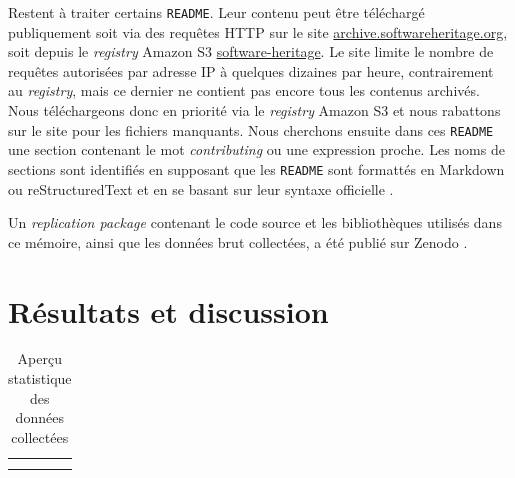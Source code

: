 \documentclass[dvipsnames,runningheads]{llncs}
\newcommand{\en}[1]{\foreignlanguage{english}{\emph{#1}}}
\begin{document}
    \label{sec:collectreadme}
    Restent à traiter certains \texttt{README}. Leur contenu peut être téléchargé publiquement soit via des
    requêtes HTTP sur le site \href{https://archive.softwareheritage.org/}{archive.softwareheritage.org}, soit
    depuis le \en{registry} Amazon S3
    \href{https://registry.opendata.aws/software-heritage}{software-heritage}. Le site limite le nombre de
    requêtes autorisées par adresse IP à quelques dizaines par heure, contrairement au \en{registry}, mais ce
    dernier ne contient pas encore tous les contenus archivés. Nous téléchargeons donc en priorité via le
    \en{registry} Amazon S3 et nous rabattons sur le site pour les fichiers manquants. Nous cherchons ensuite
    dans ces \texttt{README} une section contenant le mot \en{contributing} ou une expression proche. Les noms
    de sections sont identifiés en supposant que les \texttt{README} sont formattés en Markdown ou
    reStructuredText et en se basant sur leur syntaxe officielle \parencite{markdown-headings,rst-sections}.

    Un \en{replication package} contenant le code source et les bibliothèques utilisés dans ce mémoire, ainsi
    que les données brut collectées, a été publié sur Zenodo
    \parencite[anonymisé]{anonymous-replication-package}.

    \section{Résultats et discussion}

    \captionsetup[figure]{format=plain,singlelinecheck=true,justification=centering}
    \captionsetup[subfigure]{format=plain,singlelinecheck=true,justification=centering}
    \captionsetup[table]{format=plain,singlelinecheck=true,justification=centering,position=above}

    \begin{table}[ht]
        \centering
        \caption{Aperçu statistique des données collectées}
        \begin{tabular}{c|c}
             &
            \\
            \hline
            \\
             &
            
        \end{tabular}
        \label{tab:data_description}
    \end{table}
\end{document}
